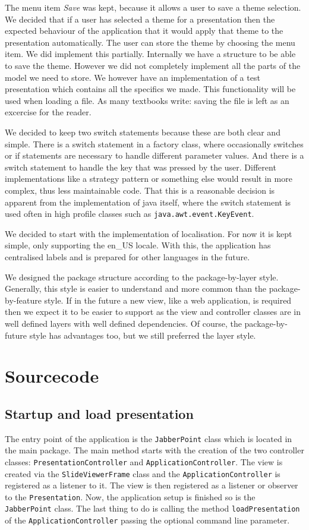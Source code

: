 \documentclass[a4paper]{article}
\begin{document}
The menu item \textit{Save} was kept, because it allows a user to save a theme selection. We decided that if a user has selected a theme for a presentation then the expected behaviour of the application that it would apply that theme to the presentation automatically. The user can store the theme by choosing the menu item. We did implement this partially. Internally we have a structure to be able to save the theme. However we did not completely implement all the parts of the model we need to store. We however have an implementation of a test presentation which contains all the specifics we made. This functionality will be used when loading a file.
As many textbooks write: saving the file is left as an excercise for the reader.

We decided to keep two switch statements because these are both clear and simple. There is a switch statement in a factory class, where occasionally switches or if statements are necessary to handle different parameter values. And there is a switch statement to handle the key that was pressed by the user. Different implementations like a strategy pattern or something else would result in more complex, thus less maintainable code. That this is a reasonable decision is apparent from the implementation of java itself, where the switch statement is used often in high profile classes such as \texttt{java.awt.event.KeyEvent}.

We decided to start with the implementation of localisation. For now it is kept simple, only supporting the en\_US locale. With this, the application has centralised labels and is prepared for other languages in the future.   

We designed the package structure according to the package-by-layer style. Generally, this style is easier to understand and more common than the package-by-feature style. If in the future a new view, like a web application, is required then we expect it to be easier to support as the view and controller classes are in well defined layers with well defined dependencies. Of course, the package-by-future style has advantages too, but we still preferred the layer style.

\section{Sourcecode}
\subsection{Startup and load presentation}
The entry point of the application is the \texttt{JabberPoint} class which is located in the main package. The main method starts with the creation of the two controller classes: \texttt{PresentationController} and \texttt{ApplicationController}. The view is created via the \texttt{SlideViewerFrame} class and the \texttt{ApplicationController} is registered as a listener to it. The view is then registered as a listener or observer to the \texttt{Presentation}. Now, the application setup is finished so is the \texttt{JabberPoint} class. The last thing to  do is calling the method \texttt{loadPresentation} of the \texttt{ApplicationController} passing the optional command line parameter.
\end{document}
